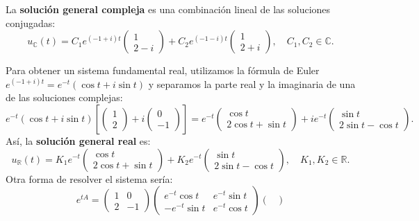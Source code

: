{\begin{itemize}
        La \textbf{solución general compleja} es una combinación lineal de las soluciones conjugadas:
        \[
            u_\mathbb{C}(t) = C_1 e^{(-1+i)t} \begin{pmatrix} 1 \\ 2-i \end{pmatrix} + C_2 e^{(-1-i)t} \begin{pmatrix} 1 \\ 2+i \end{pmatrix}, \quad C_1, C_2 \in \mathbb{C}.
        \]
        
        Para obtener un sistema fundamental real, utilizamos la fórmula de Euler $e^{(-1+i)t} = e^{-t}(\cos t + i\sin t)$ y separamos la parte real y la imaginaria de una de las soluciones complejas:
        \[
            e^{-t}(\cos t + i\sin t) \left[ \begin{pmatrix} 1 \\ 2 \end{pmatrix} + i\begin{pmatrix} 0 \\ -1 \end{pmatrix} \right] = e^{-t} \begin{pmatrix} \cos t \\ 2\cos t + \sin t \end{pmatrix} + i e^{-t} \begin{pmatrix} \sin t \\ 2\sin t - \cos t \end{pmatrix}.
        \]
        Así, la \textbf{solución general real} es:
        \[
            u_\mathbb{R}(t) = K_1 e^{-t} \begin{pmatrix} \cos t \\ 2\cos t + \sin t \end{pmatrix} + K_2 e^{-t} \begin{pmatrix} \sin t \\ 2\sin t - \cos t \end{pmatrix}, \quad K_1, K_2 \in \mathbb{R}.
        \]
        Otra forma de resolver el sistema sería:
        \[
            e^{tA} = \begin{pmatrix}
                1 & 0 \\
                2 & -1
            \end{pmatrix} \begin{pmatrix}
                e^{-t} \cos t & e^{-t} \sin t \\
                -e^{-t} \sin t & e^{-t} \cos t
            \end{pmatrix} \begin{pmatrix}

\end{pmatrix}\]
\end{itemize}}
